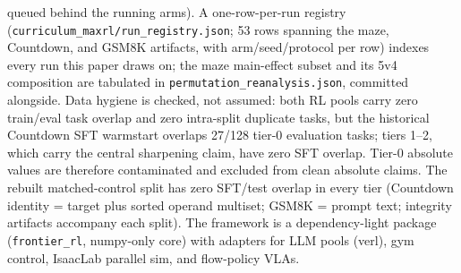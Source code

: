 queued behind the running arms). A one-row-per-run registry
(\texttt{curriculum\_maxrl/run\_registry.json}; 53 rows spanning the
maze, Countdown, and GSM8K artifacts, with arm/seed/protocol per row)
indexes every run this paper draws on; the maze main-effect subset and
its 5v4 composition are tabulated in
\texttt{permutation\_reanalysis.json}, committed alongside. Data
hygiene is checked, not assumed: both RL pools carry zero train/eval
task overlap and zero intra-split duplicate tasks, but the historical
Countdown SFT warmstart overlaps 27/128 tier-0 evaluation tasks; tiers
1--2, which carry the central sharpening claim, have zero SFT overlap.
Tier-0 absolute values are therefore contaminated and excluded from
clean absolute claims. The rebuilt matched-control split has zero
SFT/test overlap in every tier (Countdown identity = target plus sorted
operand multiset; GSM8K = prompt text; integrity artifacts accompany
each split). The
framework is a dependency-light package (\texttt{frontier\_rl},
numpy-only core) with adapters for LLM pools (verl), gym control,
IsaacLab parallel sim, and flow-policy VLAs.
